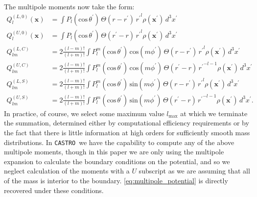 \documentclass[iop,numberedappendix]{../emulateapj}
\newcommand{\castro}{\texttt{CASTRO}}
\begin{document}
The multipole moments now take the form:
\begin{align}
  Q_l^{(L,0)}(\mathbf{x}) &= \int P_l(\text{cos}\, \theta^\prime)\, \Theta(r - r^\prime)\, {r^{\prime}}^l \rho(\mathbf{x}^\prime)\, d^3 x^\prime \\
  Q_l^{(U,0)}(\mathbf{x}) &= \int P_l(\text{cos}\, \theta^\prime)\, \Theta(r^\prime - r)\, {r^{\prime}}^l \rho(\mathbf{x}^\prime)\, d^3 x^\prime \\  
  Q_{lm}^{(L,C)} &= 2\frac{(l-m)!}{(l+m)!} \int P_{l}^{m}(\text{cos}\, \theta^\prime)\, \text{cos}(m\phi^\prime)\, \Theta(r - r^\prime)\, {r^\prime}^l \rho(\mathbf{x}^\prime)\, d^3 x^\prime \\
  Q_{lm}^{(U,C)} &= 2\frac{(l-m)!}{(l+m)!} \int P_{l}^{m}(\text{cos}\, \theta^\prime)\, \text{cos}(m\phi^\prime)\, \Theta(r^\prime - r)\, {r^\prime}^{-l-1} \rho(\mathbf{x}^\prime)\, d^3 x^\prime \\
  Q_{lm}^{(L,S)} &= 2\frac{(l-m)!}{(l+m)!} \int P_{l}^{m}(\text{cos}\, \theta^\prime)\, \text{sin}(m\phi^\prime)\, \Theta(r - r^\prime)\, {r^\prime}^l \rho(\mathbf{x}^\prime)\, d^3 x^\prime \\
  Q_{lm}^{(U,S)} &= 2\frac{(l-m)!}{(l+m)!} \int P_{l}^{m}(\text{cos}\, \theta^\prime)\, \text{sin}(m\phi^\prime)\, \Theta(r^\prime - r)\, {r^\prime}^{-l-1} \rho(\mathbf{x}^\prime)\, d^3 x^\prime.  
\end{align}
In practice, of course, we select some maximum value $l_{\text{max}}$ at which we terminate the summation, determined either by computational efficiency requirements or by the fact that there is little information at high orders for sufficiently smooth mass distributions. In \castro\ we have the capability to compute any of the above multipole moments, though in this paper we are only using the multipole expansion to calculate the boundary conditions on the potential, and so we neglect calculation of the moments with a $U$ subscript as we are assuming that all of the mass is interior to the boundary. \autoref{eq:multipole_potential} is directly recovered under these conditions.

\clearpage




\clearpage
\end{document}

